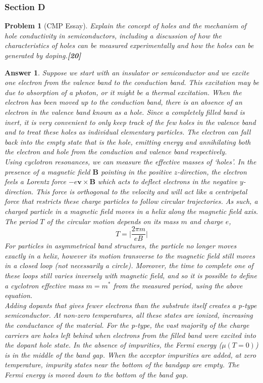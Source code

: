\documentclass[a4paper]{article}
\newtheorem{ans}{Answer}[subsection]
\theoremstyle{new}
\newtheorem{qns}{Problem}[subsection]
\begin{document}
\subsubsection{Section D}
\begin{qns}[CMP Essay]
Explain the concept of holes and the mechanism of hole conductivity in semiconductors, including a discussion of how the characteristics of holes can be measured experimentally and how the holes can be generated by doping.\hfill\textbf{[20]}
\end{qns}
\begin{ans}
Suppose we start with an insulator or semiconductor and we excite one electron from the valence band to the conduction band. This excitation may be due to absorption of a photon, or it might be a thermal excitation. When the electron has been moved up to the conduction band, there is an absence of an electron in the valence band known as a hole. Since a completely filled band is inert, it is very convenient to only keep track of the few holes in the valence band and to treat these holes as individual elementary particles. The electron can fall back into the empty state that is the hole, emitting energy and annihilating both the electron and hole from the conduction and valence band respectively.\\[5pt]
Using cyclotron resonances, we can measure the effective masses of `holes'. In the presence of a magnetic field $\mathbf{B}$ pointing in the positive $z$-direction, the electron feels a  Lorentz force $-e\mathbf{v}\times\mathbf{B}$ which acts to deflect electrons in the negative $y$-direction. This force is orthogonal to the velocity and will act like a centripetal force that restricts these charge particles to follow circular trajectories. As such, a charged particle in a magnetic field moves in a helix along the magnetic field axis. The period $T$ of the circular motion depends on its mass $m$ and charge $e$,
$$T=\bigg|\frac{2\pi m}{eB}\bigg|$$
For particles in asymmetrical band structures, the particle no longer moves exactly in a helix, however its motion transverse to the magnetic field still moves in a closed loop (not necessarily a circle). Moreover, the time to complete one of these loops still varies inversely with magnetic field, and so it is possible to define a cyclotron effective mass $m=m^*$ from the measured period, using the above equation.\\[5pt]
Adding dopants that gives fewer electrons than the substrate itself creates a p-type semiconductor. At non-zero temperatures, all these states are ionized, increasing the conductance of the material. For the p-type, the vast majority of the charge carriers are holes left behind when electrons from the filled band were excited into the dopant hole state. In the absence of impurities, the Fermi energy ($\mu(T=0)$) is in the middle of the band gap. When the acceptor impurities are added, at zero temperature, impurity states near the bottom of the bandgap are empty. The Fermi energy is moved down to the bottom of the band gap.
\end{ans}
\end{document}
